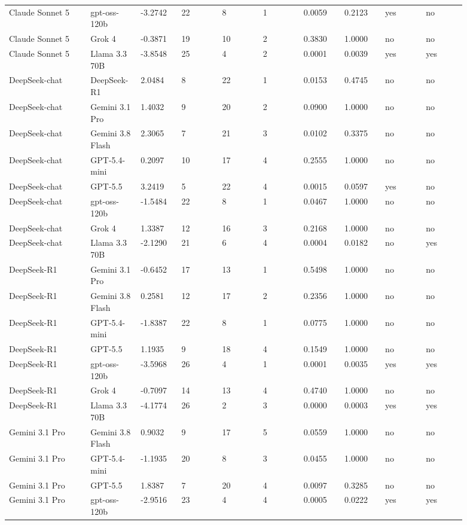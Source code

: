 \begin{landscape}
\begin{longtable}{p{0.162\linewidth}p{0.081\linewidth}p{0.081\linewidth}p{0.081\linewidth}p{0.081\linewidth}p{0.081\linewidth}p{0.081\linewidth}p{0.081\linewidth}p{0.081\linewidth}p{0.081\linewidth}}
Claude Sonnet 5 & gpt-oss-120b & -3.2742 & 22 & 8 & 1 & 0.0059 & 0.2123 & yes & no \\
Claude Sonnet 5 & Grok 4 & -0.3871 & 19 & 10 & 2 & 0.3830 & 1.0000 & no & no \\
Claude Sonnet 5 & Llama 3.3 70B & -3.8548 & 25 & 4 & 2 & 0.0001 & 0.0039 & yes & yes \\
DeepSeek-chat & DeepSeek-R1 & 2.0484 & 8 & 22 & 1 & 0.0153 & 0.4745 & no & no \\
DeepSeek-chat & Gemini 3.1 Pro & 1.4032 & 9 & 20 & 2 & 0.0900 & 1.0000 & no & no \\
DeepSeek-chat & Gemini 3.8 Flash & 2.3065 & 7 & 21 & 3 & 0.0102 & 0.3375 & no & no \\
DeepSeek-chat & GPT-5.4-mini & 0.2097 & 10 & 17 & 4 & 0.2555 & 1.0000 & no & no \\
DeepSeek-chat & GPT-5.5 & 3.2419 & 5 & 22 & 4 & 0.0015 & 0.0597 & yes & no \\
DeepSeek-chat & gpt-oss-120b & -1.5484 & 22 & 8 & 1 & 0.0467 & 1.0000 & no & no \\
DeepSeek-chat & Grok 4 & 1.3387 & 12 & 16 & 3 & 0.2168 & 1.0000 & no & no \\
DeepSeek-chat & Llama 3.3 70B & -2.1290 & 21 & 6 & 4 & 0.0004 & 0.0182 & no & yes \\
DeepSeek-R1 & Gemini 3.1 Pro & -0.6452 & 17 & 13 & 1 & 0.5498 & 1.0000 & no & no \\
DeepSeek-R1 & Gemini 3.8 Flash & 0.2581 & 12 & 17 & 2 & 0.2356 & 1.0000 & no & no \\
DeepSeek-R1 & GPT-5.4-mini & -1.8387 & 22 & 8 & 1 & 0.0775 & 1.0000 & no & no \\
DeepSeek-R1 & GPT-5.5 & 1.1935 & 9 & 18 & 4 & 0.1549 & 1.0000 & no & no \\
DeepSeek-R1 & gpt-oss-120b & -3.5968 & 26 & 4 & 1 & 0.0001 & 0.0035 & yes & yes \\
DeepSeek-R1 & Grok 4 & -0.7097 & 14 & 13 & 4 & 0.4740 & 1.0000 & no & no \\
DeepSeek-R1 & Llama 3.3 70B & -4.1774 & 26 & 2 & 3 & 0.0000 & 0.0003 & yes & yes \\
Gemini 3.1 Pro & Gemini 3.8 Flash & 0.9032 & 9 & 17 & 5 & 0.0559 & 1.0000 & no & no \\
Gemini 3.1 Pro & GPT-5.4-mini & -1.1935 & 20 & 8 & 3 & 0.0455 & 1.0000 & no & no \\
Gemini 3.1 Pro & GPT-5.5 & 1.8387 & 7 & 20 & 4 & 0.0097 & 0.3285 & no & no \\
Gemini 3.1 Pro & gpt-oss-120b & -2.9516 & 23 & 4 & 4 & 0.0005 & 0.0222 & yes & yes \\

\end{longtable}
\end{landscape}

